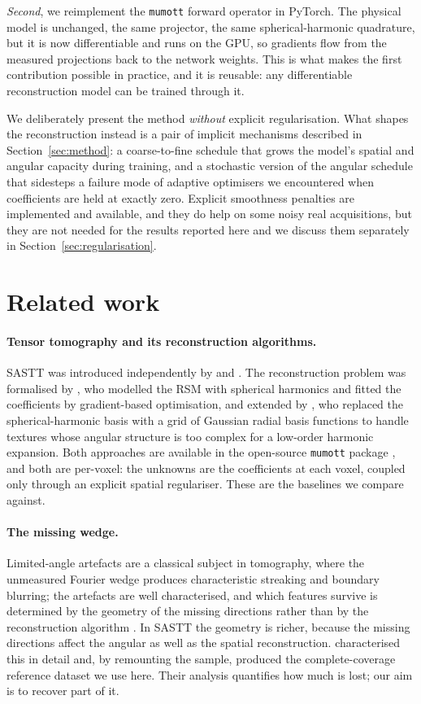 \documentclass[11pt,a4paper]{article}
\begin{document}
\emph{Second}, we reimplement the \texttt{mumott} forward operator in PyTorch. The physical
model is unchanged, the same projector, the same spherical-harmonic quadrature, but it
is now differentiable and runs on the GPU, so gradients flow from the measured projections
back to the network weights. This is what makes the first contribution possible in
practice, and it is reusable: any differentiable reconstruction model can be trained
through it.

We deliberately present the method \emph{without} explicit regularisation. What shapes the
reconstruction instead is a pair of implicit mechanisms described in
Section~\ref{sec:method}: a coarse-to-fine schedule that grows the model's spatial and
angular capacity during training, and a stochastic version of the angular schedule that
sidesteps a failure mode of adaptive optimisers we encountered when coefficients are held
at exactly zero. Explicit smoothness penalties are implemented and available, and they do
help on some noisy real acquisitions, but they are not needed for the results reported here and we discuss them separately in Section~\ref{sec:regularisation}.

\section{Related work}
\label{sec:related}

\paragraph{Tensor tomography and its reconstruction algorithms.}
SASTT was introduced independently by \citet{Liebi2015} and \citet{Schaff2015}. The
reconstruction problem was formalised by \citet{Liebi2018}, who modelled the RSM with
spherical harmonics and fitted the coefficients by gradient-based optimisation, and
extended by \citet{Nielsen2023}, who replaced the spherical-harmonic basis with a grid of
Gaussian radial basis functions to handle textures whose angular structure is too complex
for a low-order harmonic expansion. Both approaches are available in the open-source
\texttt{mumott} package \citep{mumott}, and both are per-voxel: the unknowns are the
coefficients at each voxel, coupled only through an explicit spatial regulariser. These
are the baselines we compare against.

\paragraph{The missing wedge.}
Limited-angle artefacts are a classical subject in tomography, where the unmeasured
Fourier wedge produces characteristic streaking and boundary blurring; the artefacts are
well characterised, and which features survive is determined by the geometry of the
missing directions rather than by the reconstruction algorithm \citep{Frikel2013}. In SASTT the
geometry is richer, because the missing directions affect the angular as well as the
spatial reconstruction. \citet{Nielsen2024} characterised this in detail and, by
remounting the sample, produced the complete-coverage reference dataset we use here.
Their analysis quantifies how much is lost; our aim is to recover part of it.
\end{document}
